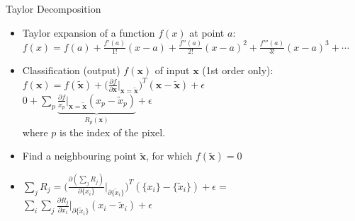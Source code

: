 \documentclass{beamer}
\begin{document}
\begin{frame}{Taylor Decomposition}

\begin{itemize}
  \item Taylor expansion of a function $f(x)$ at point $a$: \\
  $f(x) = f(a) + \frac{f'(a)}{1!}(x-a) + \frac{f''(a)}{2!}(x-a)^2 + \frac{f'''(a)}{3!}(x-a)^3 + \cdots$
\end{itemize}

\begin{itemize}
  \item Classification (output) $f(\mathbf{x})$ of input $\mathbf{x}$ (1st order only): \\
  $f(\mathbf{x}) = f(\tilde{\mathbf{x}}) + \Bigg( \frac{\partial f}{\partial \mathbf{x}} \biggr\rvert_{\mathbf{x} = \tilde{\mathbf{x}}} \Bigg)^T
  (\mathbf{x} - \tilde{\mathbf{x}}) + \epsilon $ \\
  $0 + \sum_p \underbrace{\frac{\partial f}{x_p} \biggr\rvert_{\mathbf{x} = \tilde{\mathbf{x}}} (x_p - \tilde{x}_p)}_\text{$R_p(\mathbf{x})$} + \epsilon  $ \\
  where $p$ is the index of the pixel.
  \item Find a neighbouring point $\tilde{\mathbf{x}}$, for which $f(\tilde{\mathbf{x}}) = 0$ 
  \item $\sum_j R_j = \Bigg( \frac{\partial (\sum_j R_j)}{\partial{\{x_i\}}}\biggr\rvert_{\partial \{\tilde{x}_i\} } \Bigg)^T (\{x_i\} - \{\tilde{x}_i\}) + \epsilon = $ \\ $\sum_i \sum_j \frac{\partial R_j}{\partial x_i}\biggr\rvert_{\partial \{\tilde{x}_i\} } (x_i - \tilde{x}_i) + \epsilon $
\end{itemize}

\end{frame}
\end{document}
